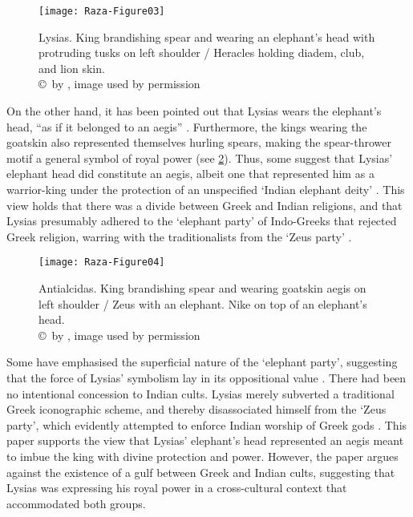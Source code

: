 \documentclass{ijsra}
\begin{document}
\begin{figure}[!htb] %
	\centering
	\texttt{[image: Raza-Figure03]}
	\caption{Lysias. King brandishing spear and wearing an elephant’s head with protruding tusks on left shoulder / Heracles holding diadem, club, and lion skin. 
		{\normalfont\scriptsize \\ \copyright\ by \cite{Coin}, image used by permission}}
	\label{fig:Raza-Figure03}
\end{figure}

On the other hand, it has been pointed out that Lysias wears the elephant’s head, “as if it belonged to an aegis” \parencite[86]{Bopearachchi1990}.
Furthermore, the kings wearing the goatskin also represented themselves hurling spears, making the spear-thrower motif a general symbol of royal power (see \cref{fig:Raza-Figure04}).
Thus, some suggest that Lysias’ elephant head did constitute an aegis, albeit one that represented him as a warrior-king under the protection of an unspecified ‘Indian elephant deity’ \parencite[35]{Whitehead1970}.
This view holds that there was a divide between Greek and Indian religions, and that Lysias presumably adhered to the ‘elephant party’ of Indo-Greeks that rejected Greek religion, warring with the traditionalists from the ‘Zeus party’ \parencites[94]{Whitehead1970}[26]{Widemann2007}.

\begin{figure}[!htb] %
	\centering
	\texttt{[image: Raza-Figure04]}
	\caption{Antialcidas. King brandishing spear and wearing goatskin aegis on left shoulder / Zeus with an elephant. Nike on top of an elephant’s head.
		{\normalfont\scriptsize \\ \copyright\ by \cite{Coin}, image used by permission}}
	\label{fig:Raza-Figure04}
\end{figure}
 
Some have emphasised the superficial nature of the ‘elephant party’, suggesting that the force of Lysias’ symbolism lay in its oppositional value \parencite[114]{Widemann2003}.
There had been no intentional concession to Indian cults. Lysias merely subverted a traditional Greek iconographic scheme, and thereby disassociated himself from the ‘Zeus party’, which evidently attempted to enforce Indian worship of Greek gods \parencite[26]{Widemann2007}.
This paper supports the view that Lysias’ elephant’s head represented an aegis meant to imbue the king with divine protection and power.
However, the paper argues against the existence of a gulf between Greek and Indian cults, suggesting that Lysias was expressing his royal power in a cross-cultural context that accommodated both groups.
  
\end{document}
